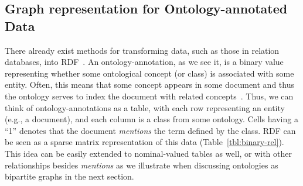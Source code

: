 \subsection{Graph representation for Ontology-annotated Data}
%
There already exist methods for transforming data, such as those in relation databases, into RDF~\cite{RDB2RDF}. An ontology-annotation, as we see it, is a binary value representing whether some ontological concept (or class) is associated with some entity.  Often, this means that some concept appears in some document and thus the ontology serves to index the document with related concepts~\cite{RI}.  Thus, we can think of ontology-annotations as a table, with each row representing an entity (e.g., a document), and each column is a class from some ontology.  Cells having a ``1'' denotes that the document \emph{mentions} the term defined by the class.  RDF can be seen as a sparse matrix representation of this data (Table~\ref{tbl:binary-rel}).  This idea can be easily extended to nominal-valued tables as well, or with other relationships besides \emph{mentions} as we illustrate when discussing ontologies as bipartite graphs in the next section.
